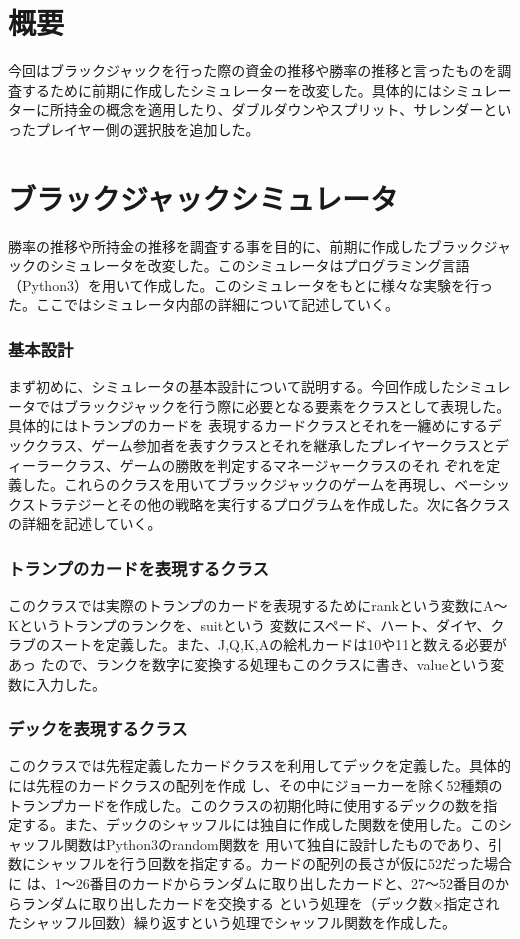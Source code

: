 \section{概要}
今回はブラックジャックを行った際の資金の推移や勝率の推移と言ったものを調査するために前期に作成したシミュレーターを改変した。具体的にはシミュレーターに所持金の概念を適用したり、ダブルダウンやスプリット、サレンダーといったプレイヤー側の選択肢を追加した。


\section{ブラックジャックシミュレータ}
勝率の推移や所持金の推移を調査する事を目的に、前期に作成したブラックジャックのシミュレータを改変した。このシミュレータはプログラミング言語（Python3）を用いて作成した。このシミュレータをもとに様々な実験を行った。ここではシミュレータ内部の詳細について記述していく。


\subsubsection{基本設計}
まず初めに、シミュレータの基本設計について説明する。今回作成したシミュレータではブラックジャックを行う際に必要となる要素をクラスとして表現した。具体的にはトランプのカードを
表現するカードクラスとそれを一纏めにするデッククラス、ゲーム参加者を表すクラスとそれを継承したプレイヤークラスとディーラークラス、ゲームの勝敗を判定するマネージャークラスのそれ
ぞれを定義した。これらのクラスを用いてブラックジャックのゲームを再現し、ベーシックストラテジーとその他の戦略を実行するプログラムを作成した。次に各クラスの詳細を記述していく。

\subsubsection{トランプのカードを表現するクラス}
このクラスでは実際のトランプのカードを表現するためにrankという変数にA～Kというトランプのランクを、suitという
変数にスペード、ハート、ダイヤ、クラブのスートを定義した。また、J,Q,K,Aの絵札カードは10や11と数える必要があっ
たので、ランクを数字に変換する処理もこのクラスに書き、valueという変数に入力した。

\subsubsection{デックを表現するクラス}
このクラスでは先程定義したカードクラスを利用してデックを定義した。具体的には先程のカードクラスの配列を作成
し、その中にジョーカーを除く52種類のトランプカードを作成した。このクラスの初期化時に使用するデックの数を指
定する。また、デックのシャッフルには独自に作成した関数を使用した。このシャッフル関数はPython3のrandom関数を
用いて独自に設計したものであり、引数にシャッフルを行う回数を指定する。カードの配列の長さが仮に52だった場合に
は、1～26番目のカードからランダムに取り出したカードと、27～52番目のからランダムに取り出したカードを交換する
という処理を（デック数×指定されたシャッフル回数）繰り返すという処理でシャッフル関数を作成した。

